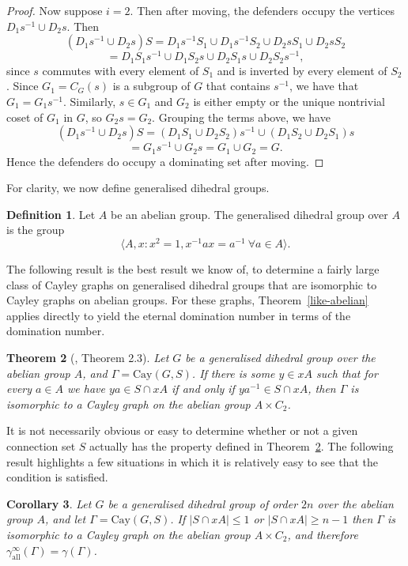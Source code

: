\documentclass{amsart}
\newtheorem{thm}{Theorem}[section]
\newtheorem{cor}[thm]{Corollary}
\theoremstyle{remark}
\theoremstyle{definition}
\newtheorem{defn}[thm]{Definition}
\newcommand{\Cay}[2]{\mathrm{Cay}(#1,#2)}		%
\newcommand{\etdom}{\gamma_{\mathrm{all}}^\infty}
\begin{document}
\begin{proof}
Now suppose $i=2$. Then after moving, the defenders occupy the vertices $D_1s^{-1} \cup D_2s$. 
Then $$(D_1s^{-1} \cup D_2 s)S  = D_1s^{-1}S_1 \cup D_1s^{-1}S_2 \cup D_2sS_1 \cup D_2sS_2$$
    $$ = D_1S_1s^{-1} \cup D_1S_2s \cup D_2S_1s\cup D_2S_2s^{-1},$$ since $s$ commutes with every element of $S_1$ and is inverted by every element of $S_2$. Since $G_1 = C_G(s)$ is a subgroup of $G$ that contains $s^{-1}$, we have that $G_1 = G_1s^{-1}$. Similarly, $s\in G_1$ and $G_2$ is either empty or the unique nontrivial coset of $G_1$ in $G$, so $G_2s=G_2$. Grouping the terms above, we have 
    $$(D_1s^{-1}\cup D_2s)S = (D_1S_1\cup D_2S_2)s^{-1} \cup (D_1S_2\cup D_2S_1)s $$ $$= G_1s^{-1}\cup G_2s = G_1\cup G_2 = G.$$
    Hence the defenders do occupy a dominating set after moving.
   \end{proof}

For clarity, we now define generalised dihedral groups.

\begin{defn}
    Let $A$ be an abelian group. The generalised dihedral group over $A$ is the group $$\langle A, x: x^2=1, x^{-1}ax=a^{-1} \ \forall a \in A\rangle.$$
\end{defn}

The following result is the best result we know of, to determine a fairly large class of Cayley graphs on generalised dihedral groups that are isomorphic to Cayley graphs on abelian groups. For these graphs, Theorem~\ref{like-abelian} applies directly to yield the eternal domination number in terms of the domination number.

\begin{thm}[\cite{MS2021}, Theorem 2.3]\label{isomorphic}
    Let $G$ be a generalised dihedral group over the abelian group $A$, and $\Gamma=\Cay{G}{S}$. If there is some $y \in xA$ such that for every $a \in A$ we have $ya \in S \cap xA$ if and only if $ya^{-1} \in S \cap xA$, then $\Gamma$ is isomorphic to a Cayley graph on the abelian group $A \times C_2$.
\end{thm}

It is not necessarily obvious or easy to determine whether or not a given connection set $S$ actually has the property defined in Theorem~\ref{isomorphic}. The following result highlights a few situations in which it is relatively easy to see that the condition is satisfied.

\begin{cor}\label{one-reflection}
    Let $G$ be a generalised dihedral group of order $2n$ over the abelian group $A$, and let $\Gamma=\Cay{G}{S}$. If $|S\cap xA| \le 1$ or $|S \cap xA| \ge n-1$ then $\Gamma$ is isomorphic to a Cayley graph on the abelian group $A \times C_2$, and therefore $\etdom(\Gamma)=\gamma(\Gamma)$.
\end{cor}
\end{document}
